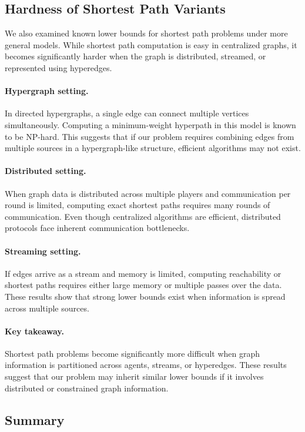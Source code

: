 \subsection{Hardness of Shortest Path Variants}

We also examined known lower bounds for shortest path problems under more
general models. While shortest path computation is easy in centralized graphs,
it becomes significantly harder when the graph is distributed, streamed, or
represented using hyperedges.

\paragraph{Hypergraph setting.}
In directed hypergraphs, a single edge can connect multiple vertices
simultaneously. Computing a minimum-weight hyperpath in this model is known to
be NP-hard. This suggests that if our problem requires combining edges from
multiple sources in a hypergraph-like structure, efficient algorithms may not
exist.

\paragraph{Distributed setting.}
When graph data is distributed across multiple players and communication per
round is limited, computing exact shortest paths requires many rounds of
communication. Even though centralized algorithms are efficient, distributed
protocols face inherent communication bottlenecks.

\paragraph{Streaming setting.}
If edges arrive as a stream and memory is limited, computing reachability or
shortest paths requires either large memory or multiple passes over the data.
These results show that strong lower bounds exist when information is spread
across multiple sources.

\paragraph{Key takeaway.}
Shortest path problems become significantly more difficult when graph
information is partitioned across agents, streams, or hyperedges. These results
suggest that our problem may inherit similar lower bounds if it involves
distributed or constrained graph information.

\subsection{Summary}

